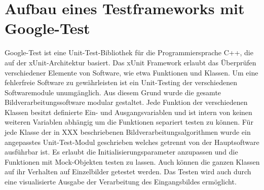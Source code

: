 %

\chapter{Aufbau eines Testframeworks mit Google-Test}
\label{cha:Aufbau eines Testframeworks mit Google-Test} 
%
%

Google-Test ist eine Unit-Test-Bibliothek f\"ur die Programmiersprache C++, die auf der xUnit-Architektur basiert. Das xUnit Framework erlaubt das \"Uberpr\"ufen verschiedener Elemente von Software, wie etwa Funktionen und Klassen. Um eine fehlerfreie Software zu gew\"ahrleisten ist ein Unit-Testing der verschiedenen Softwaremodule unumg\"anglich.
Aus diesem Grund wurde die gesamte Bildverarbeitungssoftware modular gestaltet. Jede Funktion der verschiedenen Klassen besitzt definierte Ein- und Ausgangsvariablen und ist intern von keinen weiteren Variablen abh\"angig um die Funktionen separiert testen zu k\"onnen.
F\"ur jede Klasse der in XXX beschriebenen Bildverarbeitungsalgorithmen wurde ein angepasstes Unit-Test-Modul geschrieben welches getrennt von der Hauptsoftware ausf\"uhrbar ist. Es erlaubt die Initialisierungsparameter anzupassen und die Funktionen mit Mock-Objekten testen zu lassen. Auch k\"onnen die ganzen Klassen auf ihr Verhalten auf Einzelbilder getestet werden. Das Testen wird auch durch eine visualisierte Ausgabe der Verarbeitung des Eingangsbildes erm\"oglicht.










